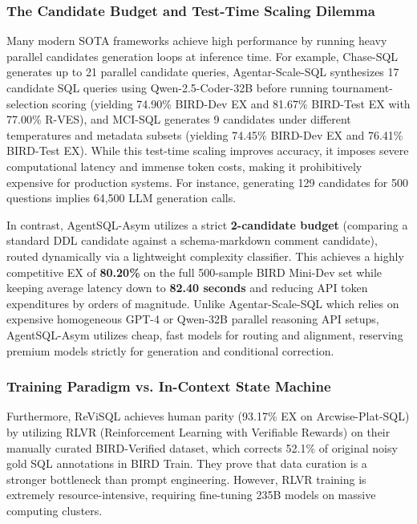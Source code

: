 \subsubsection{The Candidate Budget and Test-Time Scaling Dilemma}
Many modern SOTA frameworks achieve high performance by running heavy parallel candidates generation loops at inference time. For example, Chase-SQL generates up to 21 parallel candidate queries, Agentar-Scale-SQL \cite{wang_agentar-scale-sql_2025} synthesizes 17 candidate SQL queries using Qwen-2.5-Coder-32B before running tournament-selection scoring (yielding 74.90\% BIRD-Dev EX and 81.67\% BIRD-Test EX with 77.00\% R-VES), and MCI-SQL \cite{wang_mci-sql_2026} generates 9 candidates under different temperatures and metadata subsets (yielding 74.45\% BIRD-Dev EX and 76.41\% BIRD-Test EX). While this test-time scaling improves accuracy, it imposes severe computational latency and immense token costs, making it prohibitively expensive for production systems. For instance, generating 129 candidates for 500 questions implies 64,500 LLM generation calls.

In contrast, AgentSQL-Asym utilizes a strict \textbf{2-candidate budget} (comparing a standard DDL candidate against a schema-markdown comment candidate), routed dynamically via a lightweight complexity classifier. This achieves a highly competitive EX of \textbf{80.20\%} on the full 500-sample BIRD Mini-Dev set while keeping average latency down to \textbf{82.40 seconds} and reducing API token expenditures by orders of magnitude. Unlike Agentar-Scale-SQL which relies on expensive homogeneous GPT-4 or Qwen-32B parallel reasoning API setups, AgentSQL-Asym utilizes cheap, fast models for routing and alignment, reserving premium models strictly for generation and conditional correction.

\subsubsection{Training Paradigm vs. In-Context State Machine}
Furthermore, ReViSQL \cite{zhu2026revisqlachievinghumanleveltexttosql} achieves human parity (93.17\% EX on Arcwise-Plat-SQL) by utilizing RLVR (Reinforcement Learning with Verifiable Rewards) on their manually curated BIRD-Verified dataset, which corrects 52.1\% of original noisy gold SQL annotations in BIRD Train. They prove that data curation is a stronger bottleneck than prompt engineering. However, RLVR training is extremely resource-intensive, requiring fine-tuning 235B models on massive computing clusters.


